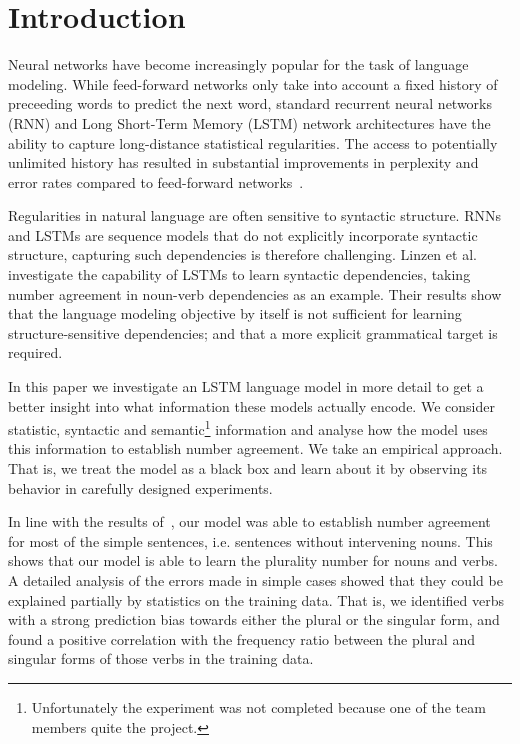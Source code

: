 \section{Introduction}

Neural networks have become increasingly popular
for the task of language modeling.
While feed-forward networks only take into account
a fixed history of preceeding words to predict the next word,
standard recurrent neural networks (RNN) and 
Long Short-Term Memory (LSTM) network architectures
have the ability to capture long-distance statistical regularities.
The access to potentially unlimited history 
has resulted in substantial improvements 
in perplexity and error rates
compared to feed-forward networks~\citep{Mikolov2010,Sundermeyer2013}. 

Regularities in natural language are often sensitive to syntactic structure.
RNNs and LSTMs are sequence models that do not explicitly
incorporate syntactic structure,
capturing such dependencies is therefore challenging.
Linzen et al.~\cite{Linzen2016} investigate the capability
of LSTMs to learn syntactic dependencies, taking
number agreement in noun-verb dependencies as an example.
Their results show that the language modeling objective by itself
is not sufficient for learning structure-sensitive dependencies;
and that a more explicit grammatical target is required.

In this paper we investigate an LSTM language model
in more detail to get a better insight into what 
information these models actually encode.
We consider statistic, syntactic and 
semantic\footnote{
Unfortunately the experiment was not completed
because one of the team members quite the project.
} information and analyse how the model uses this information
to establish number agreement. 
We take an empirical approach.
That is, we treat the model as a black box
and learn about it by observing its behavior
in carefully designed experiments.

In line with the results of~\citep{Linzen2016},
our model was able to establish number agreement 
for most of the simple sentences,
i.e. sentences without intervening nouns.
This shows that our model is able to learn the 
plurality number for nouns and verbs.
A detailed analysis of the errors made in simple cases
showed that they could be explained partially by 
statistics on the training data.
That is, we identified verbs with a strong 
prediction bias towards
either the plural or the singular form,
and found a positive correlation with the
frequency ratio between the plural and singular forms
of those verbs in the training data.
%


